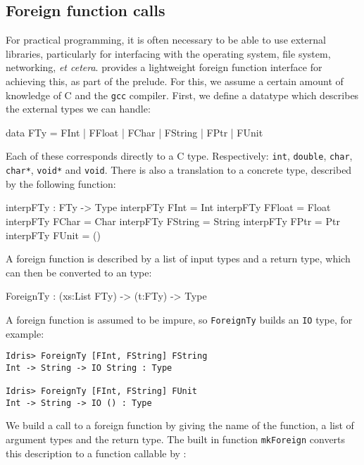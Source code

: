 \subsection{Foreign function calls}

For practical programming, it is often necessary to be able to use external libraries, particularly for interfacing with the operating system, file system, networking, \emph{et cetera}.
\Idris{} provides a lightweight foreign function interface for achieving this, as part of the prelude.
For this, we assume a certain amount of knowledge of C and the \texttt{gcc} compiler.
First, we define a datatype which describes the external types we can handle:

\begin{code}
data FTy = FInt | FFloat | FChar | FString | FPtr | FUnit
\end{code}

\noindent
Each of these corresponds directly to a C type.
Respectively: \texttt{int}, \texttt{double}, \texttt{char}, \texttt{char*}, \texttt{void*} and \texttt{void}.
There is also a translation to a concrete \Idris{} type, described by the following function:

\begin{code}
interpFTy : FTy -> Type
interpFTy FInt    = Int
interpFTy FFloat  = Float
interpFTy FChar   = Char
interpFTy FString = String
interpFTy FPtr    = Ptr
interpFTy FUnit   = ()
\end{code}

\noindent
A foreign function is described by a list of input types and a return type, which can then be converted to an \Idris{} type:

\begin{code}
ForeignTy : (xs:List FTy) -> (t:FTy) -> Type
\end{code}

\noindent
A foreign function is assumed to be impure, so \texttt{ForeignTy} builds an \texttt{IO} type, for example:

\begin{lstlisting}
Idris> ForeignTy [FInt, FString] FString
Int -> String -> IO String : Type

Idris> ForeignTy [FInt, FString] FUnit 
Int -> String -> IO () : Type
\end{lstlisting}

\noindent
We build a call to a foreign function by giving the name of the function, a list of argument types and the return type.
The built in function \texttt{mkForeign} converts this description to a function callable by \Idris{}:

